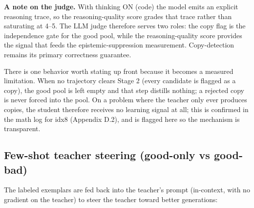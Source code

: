 \documentclass[12pt,a4paper]{report}
\begin{document}
\textbf{A note on the judge.} With thinking ON (code) the model emits an explicit reasoning trace, so the reasoning-quality score grades that trace rather than saturating at 4--5. The LLM judge therefore serves two roles: the copy flag is the independence gate for the good pool, while the reasoning-quality score provides the signal that feeds the epistemic-suppression measurement. Copy-detection remains its primary correctness guarantee.

There is one behavior worth stating up front because it becomes a measured limitation. When no trajectory clears Stage 2 (every candidate is flagged as a copy), the good pool is left empty and that step distills nothing; a rejected copy is never forced into the pool. On a problem where the teacher only ever produces copies, the student therefore receives no learning signal at all; this is confirmed in the math log for idx8 (Appendix D.2), and is flagged here so the mechanism is transparent.

\subsection{Few-shot teacher steering (good-only vs good-bad)}\label{few-shot-teacher-steering-good_only-vs-good_bad}

The labeled exemplars are fed back into the teacher's prompt (in-context, with no gradient on the teacher) to steer the teacher toward better generations:
\end{document}
